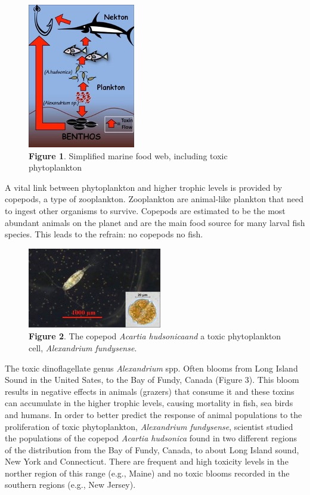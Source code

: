 \documentclass[
]{book}
\begin{document}
\begin{figure}
\centering
\includegraphics{images/figure1.png}
\caption{\textbf{Figure 1}. Simplified marine food web, including toxic phytoplankton}
\end{figure}

A vital link between phytoplankton and higher trophic levels is provided by copepods, a type of zooplankton. Zooplankton are animal-like plankton that need to ingest other organisms to survive. Copepods are estimated to be the most abundant animals on the planet and are the main food source for many larval fish species. This leads to the refrain: no copepods no fish.

\begin{figure}
\centering
\includegraphics{images/figure2.png}
\caption{\textbf{Figure 2}. The copepod \emph{Acartia hudsonicaand} a toxic phytoplankton cell, \emph{Alexandrium fundysense}.}
\end{figure}

The toxic dinoflagellate genus \emph{Alexandrium} spp. Often blooms from Long Island Sound in the United Sates, to the Bay of Fundy, Canada (Figure 3). This bloom results in negative effects in animals (grazers) that consume it and these toxins can accumulate in the higher trophic levels, causing mortality in fish, sea birds and humans. In order to better predict the response of animal populations to the proliferation of toxic phytoplankton, \emph{Alexandrium fundysense}, scientist studied the populations of the copepod \emph{Acartia hudsonica} found in two different regions of the distribution from the Bay of Fundy, Canada, to about Long Island sound, New York and Connecticut. There are frequent and high toxicity levels in the norther region of this range (e.g., Maine) and no toxic blooms recorded in the southern regions (e.g., New Jersey).
\end{document}
